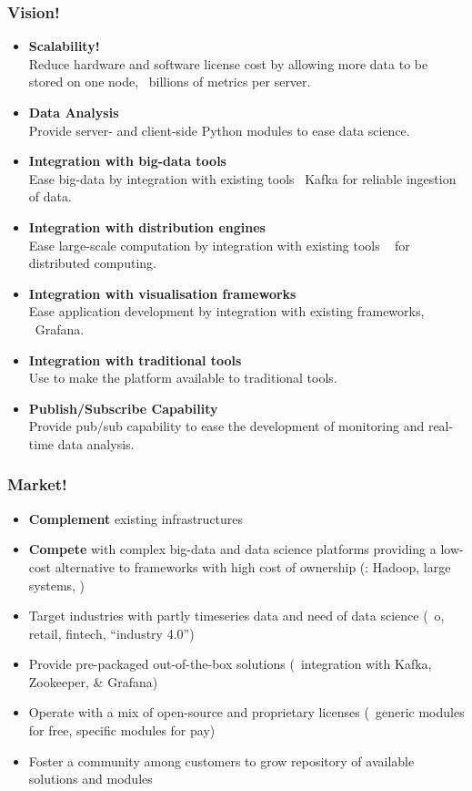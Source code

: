 \documentclass{beamer}
\begin{document}
\begin{frame}[shrink]
\frametitle{Vision!}
\begin{itemize}
\item \textbf{Scalability!}\\
      Reduce hardware and software license cost
      by allowing more data to be stored on one node,
      \ie\ billions of metrics per server.
\item \textbf{Data Analysis}\\
      Provide server- and client-side Python modules
      to ease data science.
\item \textbf{Integration with big-data tools}\\
      Ease big-data by integration with existing tools
      \eg\ Kafka for reliable ingestion of data.
\item \textbf{Integration with distribution engines}\\
      Ease large-scale computation by integration with existing tools
      \eg\  for distributed computing.
\item \textbf{Integration with visualisation frameworks}\\
      Ease application development by integration with existing
       frameworks, \eg\ Grafana.
\item \textbf{Integration with traditional tools}\\
      Use  to make the platform available
      to traditional tools.
\item \textbf{Publish/Subscribe Capability}\\
      Provide pub/sub capability to ease the development
      of monitoring and real-time data analysis.
\end{itemize}
\end{frame}

\begin{frame}
\frametitle{Market!}
\begin{itemize}
\item \textbf{Complement} existing  infrastructures
\item \textbf{Compete} with complex big-data and data science platforms
      providing a low-cost alternative 
      to frameworks with high cost of ownership
      (\eg: Hadoop, large  systems, \etc)
\item Target industries with partly timeseries data 
      and need of data science
      (\eg\ o, retail, fintech, ``industry 4.0'')
\item Provide pre-packaged out-of-the-box solutions
      (\eg\ integration with Kafka, Zookeeper,  \& Grafana)
\item Operate with a mix of open-source and proprietary licenses
      (\eg\ generic modules for free, specific modules for pay)
\item Foster a community among customers to grow repository of
      available solutions and modules
\end{itemize}
\end{frame}
\end{document}
